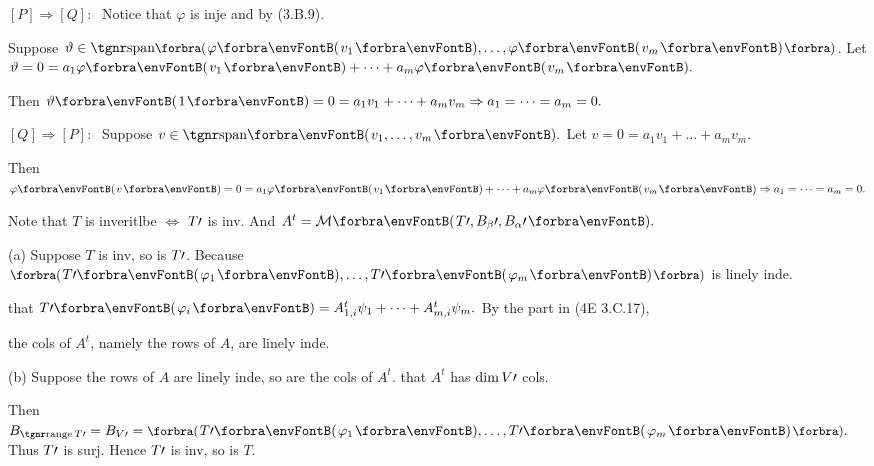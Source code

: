 \par\quad
$[P]\Rightarrow[Q]:\;$ Notice that $\varphi$ is inje and by (3.B.9).\par\quad
\Blind{$[P]\Rightarrow[Q]:\;$} \Or Suppose $\vartheta\in\Span[\BigPar]{\varphi\Par{v_1},\dots,\varphi\Par{v_m}}$. Let $\vartheta=0=a_1\varphi\Par{v_1}+\dots+a_m\varphi\Par{v_m}.$\par\quad
\Blind{$[P]\Rightarrow[Q]:\;$} Then $\vartheta\Par{1}=0=a_1 v_1+\dots+a_m v_m\Rightarrow a_1=\dots=a_m=0.$\vspace{2pt}\par\quad
$[Q]\Rightarrow[P]:\;$ Suppose $v\in\Span{v_1,\dots,v_m}.$ Let $v=0=a_1 v_1+\dots+a_m v_m.$\par\quad
\Blind{$[Q]\Rightarrow[P]:\;$} Then $\varphi\Par{v}=0=a_1\varphi\Par{v_1}+\dots+a_m\varphi\Par{v_m}\Rightarrow a_1=\dots=a_m=0.$\PfEnd\vspace{-3pt}
\SepLine

Note that $T$ is inveritlbe $\Longleftrightarrow$ $T\prime$ is inv. And $A^t=\Mt{T\apostrophe,B_{\beta}\apostrophe,B_{\alpha}\apostrophe}.$\par\quad
(a) Suppose $T$ is inv, so is $T\prime$. Because $\BigPar{T\apostrophe\Par{\varphi_1},\dots,T\apostrophe\Par{\varphi_m}}$ is linely inde.\par\quad\Ha
\NOTICE that $T\apostrophe\Par{\varphi_i}=A^t_{1,i}\psi_1+\dots+A^t_{m,i}\psi_m.$ By the \Par{$\Delta$} part in (4E 3.C.17),\par\quad\Ha
the cols of $A^t$, namely the rows of $A$, are linely inde.\par\quad
(b) Suppose the rows of $A$ are linely inde, so are the cols of $A^t$. \NOTICE that $A^t$ has $\dim V\prime$ cols.\par\quad\Hb
Then $B_{\range T\apostrophe}=B_{V\apostrophe}=\BigPar{T\apostrophe\Par{\varphi_1},\dots,T\apostrophe\Par{\varphi_m}}.$ Thus $T\prime$ is surj. Hence $T\prime$ is inv, so is $T.$\PfEnd
\SepLine

